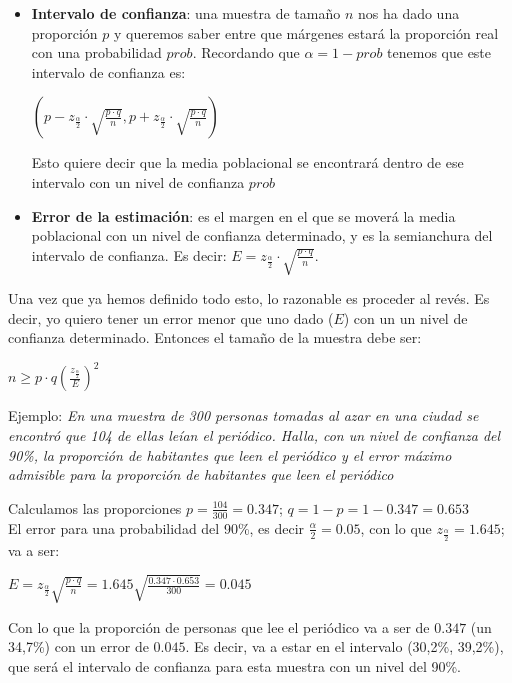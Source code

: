 \documentclass[a4paper,10pt,answers]{exam}
\begin{document}
\begin{itemize}
	\item \textbf{Intervalo de confianza}: una muestra de tamaño $n$ nos ha dado una proporción $p$ y 
	queremos saber entre
	que márgenes estará la proporción real con una probabilidad $prob$. Recordando que $\alpha = 1 - prob$ tenemos que este
	intervalo de confianza es:
	\begin{center}
		$\left( p - z_{\frac{\alpha}{2}} \cdot \sqrt{\frac{p \cdot q}{n}}, p + z_{\frac{\alpha}{2}} \cdot \sqrt{\frac{p \cdot q}{n}} \right)$
	\end{center}
	Esto quiere decir que la media poblacional se encontrará dentro de ese intervalo con un nivel de confianza $prob$
	\item \textbf{Error de la estimación}: es el margen en el que se moverá la media poblacional con un nivel de confianza determinado, y es la semianchura del intervalo de confianza. Es decir: $E = z_{\frac{\alpha}{2}} \cdot \sqrt{\frac{p \cdot q}{n}}$.
\end{itemize}
Una vez que ya hemos definido todo esto, lo razonable es proceder al revés. Es decir, yo quiero tener un error menor que uno dado ($E$) con un un nivel de confianza determinado. Entonces el tamaño de la muestra debe ser:
\begin{center}
$n \geq p \cdot q \left(\frac{z_{\frac{\alpha}{2}} }{E} \right)^2$
\end{center}

Ejemplo:
\emph{ En una muestra de 300 personas tomadas al azar en una ciudad se encontró que 104 de ellas leían el periódico.
Halla, con un nivel de confianza del 90\%, la proporción de habitantes que leen el periódico y el error máximo admisible
para la proporción de habitantes que leen el periódico}
\begin{solution}
Calculamos las proporciones $p=\frac{104}{300} = 0.347$; $q = 1-p = 1-0.347=0.653$ \\
El error para una probabilidad del 90\%, es decir $\frac{\alpha}{2} = 0.05$, con lo que $z_{\frac{\alpha}{2}} = 1.645$; va a ser:
\begin{center}
$E = z_{\frac{\alpha}{2} }\sqrt{\frac{p \cdot q}{n}} = 1.645 \sqrt{\frac{0.347 \cdot 0.653}{300}} = 0.045$
\end{center}
Con lo que la proporción de personas que lee el periódico va a ser de $0.347$ (un 34,7\%) con un error de $0.045$. Es decir, va a estar en el intervalo (30,2\%, 39,2\%), que será el intervalo de confianza para esta muestra con un nivel del 90\%.
\end{solution}
\end{document}
